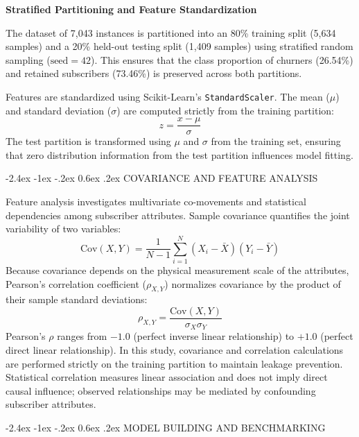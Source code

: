 \documentclass[12pt,oneside]{report}
\makeatletter
\renewcommand{\section}{\@startsection{section}{1}{\z@}%
  {-2.4ex \@plus -1ex \@minus -.2ex}%
  {0.6ex \@plus .2ex}%
  {\normalfont\large\bfseries}}
\makeatother
\begin{document}
\textbf{Stratified Partitioning and Feature Standardization}

The dataset of 7,043 instances is partitioned into an 80\% training split (5,634 samples) and a 20\% held-out testing split (1,409 samples) using stratified random sampling ($\text{seed}=42$). This ensures that the class proportion of churners (26.54\%) and retained subscribers (73.46\%) is preserved across both partitions.

Features are standardized using Scikit-Learn's \texttt{StandardScaler}. The mean ($\mu$) and standard deviation ($\sigma$) are computed strictly from the training partition:
\begin{equation}
    z = \frac{x - \mu}{\sigma}
\end{equation}
The test partition is transformed using $\mu$ and $\sigma$ from the training set, ensuring that zero distribution information from the test partition influences model fitting.

\section{COVARIANCE AND FEATURE ANALYSIS}

Feature analysis investigates multivariate co-movements and statistical dependencies among subscriber attributes. Sample covariance quantifies the joint variability of two variables:
\begin{equation}
    \text{Cov}(X, Y) = \frac{1}{N - 1} \sum_{i=1}^N (X_i - \bar{X})(Y_i - \bar{Y})
\end{equation}
Because covariance depends on the physical measurement scale of the attributes, Pearson's correlation coefficient ($\rho_{X, Y}$) normalizes covariance by the product of their sample standard deviations:
\begin{equation}
    \rho_{X, Y} = \frac{\text{Cov}(X, Y)}{\sigma_X \sigma_Y}
\end{equation}
Pearson's $\rho$ ranges from $-1.0$ (perfect inverse linear relationship) to $+1.0$ (perfect direct linear relationship). In this study, covariance and correlation calculations are performed strictly on the training partition to maintain leakage prevention. Statistical correlation measures linear association and does not imply direct causal influence; observed relationships may be mediated by confounding subscriber attributes.

\section{MODEL BUILDING AND BENCHMARKING}
\end{document}
